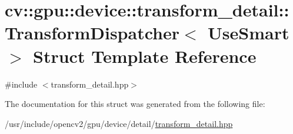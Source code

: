 \hypertarget{structcv_1_1gpu_1_1device_1_1transform__detail_1_1TransformDispatcher}{\section{cv\-:\-:gpu\-:\-:device\-:\-:transform\-\_\-detail\-:\-:Transform\-Dispatcher$<$ Use\-Smart $>$ Struct Template Reference}
\label{structcv_1_1gpu_1_1device_1_1transform__detail_1_1TransformDispatcher}
}


{\ttfamily \#include $<$transform\-\_\-detail.\-hpp$>$}



The documentation for this struct was generated from the following file\-:\begin{DoxyCompactItemize}
\item 
/usr/include/opencv2/gpu/device/detail/\hyperlink{transform__detail_8hpp}{transform\-\_\-detail.\-hpp}\end{DoxyCompactItemize}
